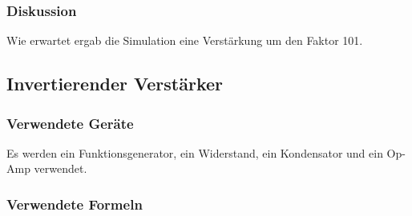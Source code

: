 \documentclass[12pt,a4paper]{article}
\begin{document}
\subsubsection{Diskussion}

Wie erwartet ergab die Simulation eine Verstärkung um den Faktor 101.





\subsection{Invertierender Verstärker}
\subsubsection{Verwendete Geräte}

Es werden ein Funktionsgenerator, ein Widerstand, ein Kondensator und ein Op-Amp verwendet.

\subsubsection{Verwendete Formeln}
\end{document}
